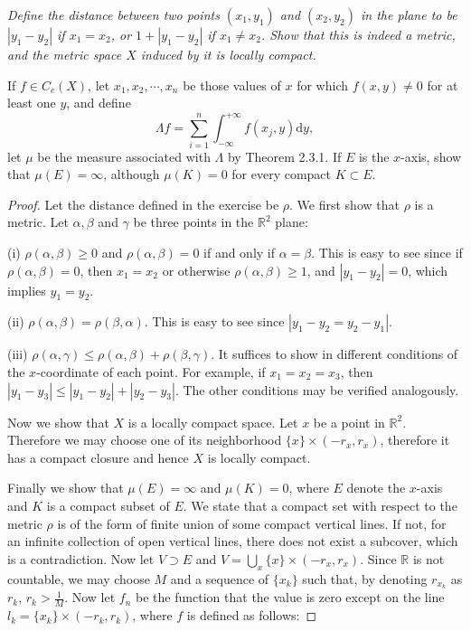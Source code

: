 \begin{problem}\em
Define the distance between two points $(x_1,y_1)$ and $(x_2,y_2)$ in the plane to be $|y_1-y_2|$ if $x_1=x_2$, or $1+|y_1-y_2|$ if $x_1\ne x_2$. Show that this is indeed a metric, and the metric space $X$ induced by it is locally compact.\par
If $f\in C_c(X)$, let $x_1,x_2,\cdots,x_n$ be those values of $x$ for which $f(x,y)\ne 0$ for at least one $y$, and define 
$$\Lambda f=\sum_{i=1}^n\int_{-\infty}^{+\infty}f(x_j,y)\mathrm{d}y,$$
let $\mu$ be the measure associated with $\Lambda$ by Theorem 2.3.1. If $E$ is the $x$-axis, show that $\mu(E)=\infty$, although $\mu(K)=0$ for every compact $K\subset E$.
\end{problem}
\begin{proof}
Let the distance defined in the exercise be $\rho$. We first show that $\rho$ is a metric. Let $\alpha,\beta$ and $\gamma$ be three points in the $\mathbb{R}^2$ plane:\par
(i) $\rho(\alpha,\beta)\ge 0$ and $\rho(\alpha,\beta)=0$ if and only if $\alpha=\beta$. This is easy to see since if $\rho(\alpha,\beta)=0$, then $x_1=x_2$ or otherwise $\rho(\alpha,\beta)\ge 1$, and $|y_1-y_2|=0$, which implies $y_1=y_2$.\par
(ii) $\rho(\alpha,\beta)=\rho(\beta,\alpha)$. This is easy to see since $|y_1-y_2=y_2-y_1|$.\par
(iii) $\rho(\alpha,\gamma)\le\rho(\alpha,\beta)+\rho(\beta,\gamma)$. It suffices to show in different conditions of the $x$-coordinate of each point. For example, if $x_1=x_2=x_3$, then $|y_1-y_3|\le|y_1-y_2|+|y_2-y_3|$. The other conditions may be verified analogously.\par
Now we show that $X$ is a locally compact space. Let $x$ be a point in $\mathbb{R}^2$. Therefore we may choose one of its neighborhood $\{x\}\times(-r_x,r_x)$, therefore it has a compact closure and hence $X$ is locally compact.\par
Finally we show that $\mu(E)=\infty$ and $\mu(K)=0$, where $E$ denote the $x$-axis and $K$ is a compact subset of $E$. We state that a compact set with respect to the metric $\rho$ is of the form of finite union of some compact vertical lines. If not, for an infinite collection of open vertical lines, there does not exist a subcover, which is a contradiction. Now let $V\supset E$ and $V=\bigcup_x\{x\}\times(-r_x,r_x)$. Since $\mathbb{R}$ is not countable, we may choose $M$ and a sequence of $\{x_k\}$ such that, by denoting $r_{x_k}$ as $r_k$, $r_k>\frac{1}{M}$. Now let $f_n$ be the function that the value is zero except on the line $l_k=\{x_k\}\times(-r_k,r_k)$, where $f$ is defined as follows:

\end{proof}
